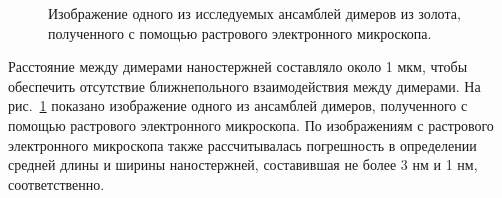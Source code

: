 \begin{figure}[!h]
\caption{Изображение одного из исследуемых ансамблей димеров из золота, полученного с помощью растрового электронного микроскопа.}
\label{img:SEMsample}
\end{figure}
Расстояние между димерами наностержней составляло около 1 мкм, чтобы обеспечить отсутствие ближнепольного взаимодействия между димерами. На рис.~\ref{img:SEMsample} показано изображение одного из ансамблей димеров, полученного с помощью растрового электронного микроскопа.
По изображениям с растрового электронного микроскопа также рассчитывалась погрешность в определении средней длины и ширины наностержней, составившая не более 3 нм и 1 нм, соответственно.

